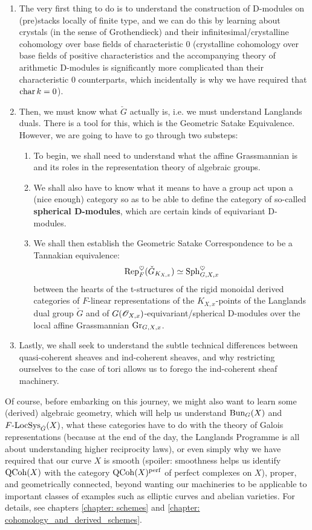             \begin{enumerate}
                \item The very first thing to do is to understand the construction of D-modules on (pre)stacks locally of finite type, and we can do this by learning about crystals (in the sense of Grothendieck) and their infinitesimal/crystalline cohomology over base fields of characteristic $0$ (crystalline cohomology over base fields of positive characteristics and the accompanying theory of arithmetic D-modules is significantly more complicated than their characteristic $0$ counterparts, which incidentally is why we have required that $\operatorname{char} k = 0$).
                \item Then, we must know what $\check{G}$ actually is, i.e. we must understand Langlands duals. There is a tool for this, which is the Geometric Satake Equivalence. However, we are going to have to go through two substeps:
                    \begin{enumerate}
                        \item To begin, we shall need to understand what the affine Grassmannian is and its roles in the representation theory of algebraic groups.
                        \item We shall also have to know what it means to have a group act upon a (nice enough) category so as to be able to define the category of so-called \textbf{spherical D-modules}, which are certain kinds of equivariant D-modules.
                        \item We shall then establish the Geometric Satake Correspondence to be a Tannakian equivalence:
                            $$\mathrm{Rep}^{\heartsuit}_F(\check{G}_{K_{X, x}}) \simeq \mathrm{Sph}^{\heartsuit}_{G, X, x}$$
                        between the hearts of the t-structures of the rigid monoidal derived categories of $F$-linear representations of the $K_{X, x}$-points of the Langlands dual group $\check{G}$ and of $G(\mathscr{O}_{X, x})$-equivariant/spherical D-modules over the local affine Grassmannian $\mathrm{Gr}_{G, X, x}$.
                    \end{enumerate}
                \item Lastly, we shall seek to understand the subtle technical differences between quasi-coherent sheaves and ind-coherent sheaves, and why restricting ourselves to the case of tori allows us to forego the ind-coherent sheaf machinery. 
            \end{enumerate}
        Of course, before embarking on this journey, we might also want to learn some (derived) algebraic geometry, which will help us understand $\mathrm{Bun}_G(X)$ and $F\text{-}\mathrm{LocSys}_{\check{G}}(X)$, what these categories have to do with the theory of Galois representations (because at the end of the day, the Langlands Programme is all about understanding higher reciprocity laws), or even simply why we have required that our curve $X$ is smooth (spoiler: smoothness helps us identify $\mathrm{QCoh}(X)$ with the category $\mathrm{QCoh}(X)^{\mathrm{perf}}$ of perfect complexes on $X$), proper, and geometrically connected, beyond wanting our machineries to be applicable to important classes of examples such as elliptic curves and abelian varieties. For details, see chapters \ref{chapter: schemes} and \ref{chapter: cohomology_and_derived_schemes}.
